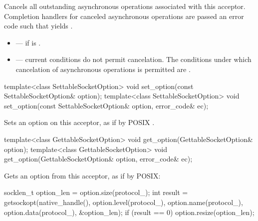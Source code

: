 \begin{itemdescr}
\pnum
\effects Cancels all outstanding asynchronous operations associated with this acceptor. Completion handlers for canceled asynchronous operations are passed an error code  such that  yields .

\pnum
\errors
\begin{itemize}
\item
{} --- if  is .
\item
{} --- current conditions do not permit cancelation. The conditions under which cancelation of asynchronous operations is permitted are .
\end{itemize}
\end{itemdescr}

\begin{itemdecl}
template<class SettableSocketOption>
  void set_option(const SettableSocketOption& option);
template<class SettableSocketOption>
  void set_option(const SettableSocketOption& option, error_code& ec);
\end{itemdecl}

\begin{itemdescr}
\pnum
\effects Sets an option on this acceptor, as if by POSIX .
\end{itemdescr}

\begin{itemdecl}
template<class GettableSocketOption>
  void get_option(GettableSocketOption& option);
template<class GettableSocketOption>
  void get_option(GettableSocketOption& option, error_code& ec);
\end{itemdecl}

\begin{itemdescr}
\pnum
\effects Gets an option from this acceptor, as if by POSIX: 
\begin{codeblock}
socklen_t option_len = option.size(protocol_);
int result = getsockopt(native_handle(), option.level(protocol_),
                        option.name(protocol_), option.data(protocol_),
                        &option_len);
if (result == 0)
  option.resize(option_len);
\end{codeblock}

\end{itemdescr}


